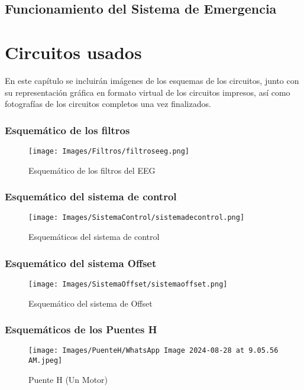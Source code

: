 \documentclass{article}
\begin{document}
\subsection{Funcionamiento del Sistema de Emergencia}



\section{Circuitos usados}
En este capítulo se incluirán imágenes de los esquemas de los circuitos, junto con su representación gráfica en formato virtual de los circuitos impresos, así como fotografías de los circuitos completos una vez finalizados.


\subsubsection{Esquemático de los filtros}
\begin{figure}[H]
    \centering
    \texttt{[image: Images/Filtros/filtroseeg.png]}
    \caption{Esquemático de los filtros del EEG}
\end{figure}

\subsubsection{Esquemático del sistema de control}
\begin{figure}[H]
    \centering
    \texttt{[image: Images/SistemaControl/sistemadecontrol.png]}
    \caption{Esquemáticos del sistema de control}
\end{figure}

\subsubsection{Esquemático del sistema Offset}
\begin{figure}[H]
    \centering
    \texttt{[image: Images/SistemaOffset/sistemaoffset.png]}
    \caption{Esquemático del sistema de Offset}
\end{figure}

\subsubsection{Esquemáticos de los Puentes H}
\begin{figure}[H]
    \centering
     \texttt{[image: Images/PuenteH/WhatsApp Image 2024-08-28 at 9.05.56 AM.jpeg]}
    \caption{Puente H (Un Motor)}
\end{figure}
\end{document}

